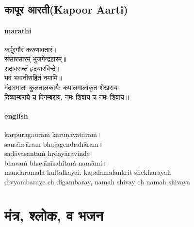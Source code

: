 \documentclass[letterpaper,twocolumn,openany,nodeprecatedcode]{dndbook}
\begin{document}
\chapter{कापूर आरती(Kapoor Aarti)}
\begin{flushleft}
  \subsection*{marathi}
  कर्पूरगौरं करुणावतारं।\\
  संसारसारम् भुजगेन्द्रहारम्॥ \\
  सदावसन्तं हृदयारविन्दे।\\
  भवं भवानीसहितं नमामि॥\\
  मंदारमाला कुलतालकायै: कपालमालांकृत शेखरायः \\
  दिव्याम्बराये च दिगम्बराय, नमः शिवाय च नमः शिवाय॥ \\
  \pagebreak
  \subsection*{english}
  \textenglish{
    karpūragauraṁ karuṇāvatāraṁ। \\
    sansārsāram bhujagendrahāram॥ \\
    sadāvasantaṁ hṛdayāravinde। \\
    bhavaṁ bhavānīsahitaṁ namāmi॥ \\
    mandaramala kultalkayai: kapalamalankrit shekharayah \\ divyambaraye ch digambaray, namah shivay ch namah shivaya \\
  }
\end{flushleft}
\pagebreak
\part{मंत्र, श्लोक, व भजन}
\end{document}
